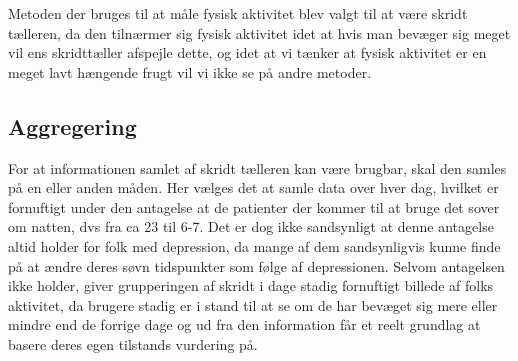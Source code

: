 Metoden der bruges til at måle fysisk aktivitet blev valgt til at være skridt tælleren, da den tilnærmer sig fysisk aktivitet idet at hvis man bevæger sig meget vil ens skridttæller afspejle dette, og idet at vi tænker at fysisk aktivitet er en meget lavt hængende frugt vil vi ikke se på andre metoder.

\subsection{Aggregering}
For at informationen samlet af skridt tælleren kan være brugbar, skal den samles på en eller anden måden.
Her vælges det at samle data over hver dag, hvilket er fornuftigt under den antagelse at de patienter der kommer til at bruge det sover om natten, dvs fra ca 23 til 6-7.
Det er dog ikke sandsynligt at denne antagelse altid holder for folk med depression, da mange af dem sandsynligvis kunne finde på at ændre deres søvn tidspunkter som følge af depressionen.
Selvom antagelsen ikke holder, giver grupperingen af skridt i dage stadig fornuftigt billede af folks aktivitet, da brugere stadig er i stand til at se om de har bevæget sig mere eller mindre end de forrige dage og ud fra den information får et reelt grundlag at basere deres egen tilstands vurdering på.